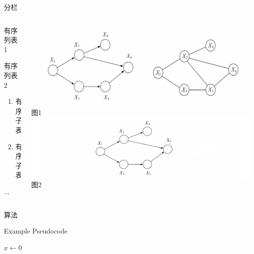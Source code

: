 \documentclass{beamer}
\begin{document}
\begin{frame}{分栏}
    \begin{columns}
        \begin{column}{0.4\textwidth}
        \begin{cenumerate}{0.4}
            \item 有序列表1
            \item 有序列表2
            \begin{enumerate}
                \item 有序子表
                \item 有序子表
            \end{enumerate}
            \item ...
        \end{cenumerate}
        \end{column}
        
        \begin{column}{0.6\textwidth}
            \centering
            \includegraphics[width=\textwidth]{assets/example/11.1.1.png}\\
            图1
            \\
            \includegraphics[width=\textwidth]{assets/example/11.2.1.png}\\
            图2
        \end{column}
    \end{columns}
\end{frame}

\begin{frame}{算法}
    \centering
    \begin{minipage}{0.7\textwidth}
        \begin{algorithm}[H]
            \caption{Example Pseudocode}
            \begin{algorithmic}
                \STATE $x\gets0$
                \ELSE
                \ENDIF
            \end{algorithmic}
        \end{algorithm}
    \end{minipage}
\end{frame}
\end{document}
